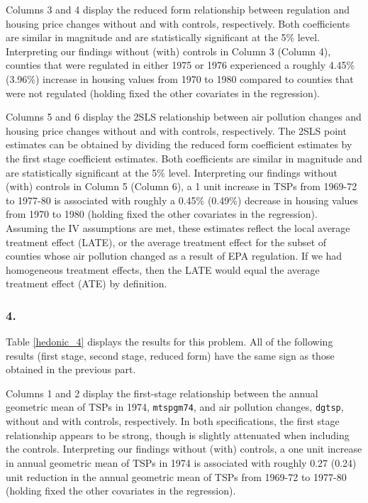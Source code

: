 \documentclass[12pt]{article}
\begin{document}
Columns 3 and 4 display the reduced form relationship between regulation and housing price changes without and with controls, respectively. Both coefficients are similar in magnitude and are statistically significant at the 5\% level. Interpreting our findings without (with) controls in Column 3 (Column 4), counties that were regulated in either 1975 or 1976 experienced a roughly 4.45\% (3.96\%) increase in housing values from 1970 to 1980 compared to counties that were not regulated (holding fixed the other covariates in the regression).

Columns 5 and 6 display the 2SLS relationship between air pollution changes and housing price changes without and with controls, respectively. The 2SLS point estimates can be obtained by dividing the reduced form coefficient estimates by the first stage coefficient estimates. Both coefficients are similar in magnitude and are statistically significant at the 5\% level. Interpreting our findings without (with) controls in Column 5 (Column 6), a 1 unit increase in TSPs from 1969-72 to 1977-80 is associated with roughly a 0.45\% (0.49\%) decrease in housing values from 1970 to 1980 (holding fixed the other covariates in the regression). Assuming the IV assumptions are met, these estimates reflect the local average treatment effect (LATE), or the average treatment effect for the subset of counties whose air pollution changed as a result of EPA regulation. If we had homogeneous treatment effects, then the LATE would equal the average treatment effect (ATE) by definition.

\subsubsection*{4.}
Table \ref{hedonic_4} displays the results for this problem. All of the following results (first stage, second stage, reduced form) have the same sign as those obtained in the previous part.

Columns 1 and 2 display the first-stage relationship between the annual geometric mean of TSPs in 1974, \texttt{mtspgm74}, and air pollution changes, \texttt{dgtsp}, without and with controls, respectively. In both specifications, the first stage relationship appears to be strong, though is slightly attenuated when including the controls. Interpreting our findings without (with) controls, a one unit increase in annual geometric mean of TSPs in 1974 is associated with roughly 0.27 (0.24) unit reduction in the annual geometric mean of TSPs from 1969-72 to 1977-80 (holding fixed the other covariates in the regression).
\end{document}
